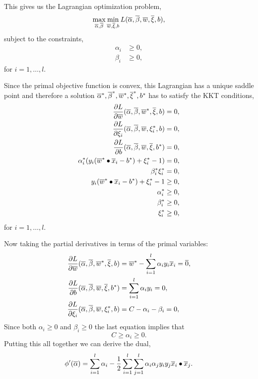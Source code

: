 \documentclass[a4paper,blends,pdf,colorBG,slideColor]{prosper}
\begin{document}
This gives us the Lagrangian optimization problem,
\begin{equation*}
\max_{\overline{\alpha},\overline{\beta}} \min_{\overline{w},\overline{\xi},b} L(\overline{\alpha},\overline{\beta},\overline{w},\overline{\xi},b),
\end{equation*}
subject to the constraints,
\begin{align*}
\alpha_i &\ge 0,\\
\beta_i &\ge 0,
\end{align*}
for $i = 1,\ldots,l.$

\es

Since the primal objective function is convex, this Lagrangian has a unique saddle point
and therefore
a solution $\overline{\alpha}^*, \overline{\beta}^*,\overline{w}^*,\overline{\xi}^*, b^*$ has to satisfy the KKT conditions,
\begin{align*}
\frac{\partial L}{\partial \overline{w}}(\overline{\alpha},\overline{\beta}, \overline{w}^*,\overline{\xi},b) &= 0,\\
\frac{\partial L}{\partial \xi_i}(\overline{\alpha},\overline{\beta},\overline{w},\xi^*_i,b) &= 0,\\
\frac{\partial L}{\partial b}(\overline{\alpha},\overline{\beta},\overline{w},\overline{\xi},b^*) &= 0,\\
\alpha^*_i (y_i(\overline{w}^*\bullet\overline{x}_i - b^*) + \xi^*_i -1)&= 0, \\
\beta^*_i\xi^*_i&= 0,\\
y_i(\overline{w}^*\bullet\overline{x}_i - b^*) + \xi^*_i -1&\ge 0, \\
\alpha^*_i &\ge 0,\\
\beta^*_i &\ge 0,\\
\xi^*_i &\ge 0,
\end{align*}
for $i = 1,\ldots,l$.
\es

\small
Now taking the partial derivatives in terms of the primal variables:
\begin{align*}
\frac{\partial L}{\partial \overline{w}}(\overline{\alpha},\overline{\beta}, \overline{w}^*,\overline{\xi},b) &=
	\overline{w}^* - \sum_{i=1}^l \alpha_i y_i  \overline{x}_i = \overline{0},\\
\frac{\partial L}{\partial b}(\overline{\alpha},\overline{\beta},\overline{w},\overline{\xi},b^*) &=\sum_{i=1}^l \alpha_i y_i = 0,\\
\frac{\partial L}{\partial \xi_i}(\overline{\alpha},\overline{\beta},\overline{w},\xi^*_i,b) &= C - \alpha_i - \beta_i= 0,
\end{align*}
Since both $\alpha_i \ge 0$ and $\beta_i \ge 0$ the last equation implies that
\begin{equation*}
C \ge \alpha_i \ge 0.
\end{equation*}
Putting this all together we can derive the dual,
\begin{equation*}
\phi'(\overline{\alpha}) = 
  \sum_{i=1}^l \alpha_i - 
  \frac{1}{2}\sum_{i=1}^l \sum_{j=1}^l \alpha_i \alpha_j y_i y_j \overline{x}_i \bullet \overline{x}_j.
\end{equation*}
\es
\end{document}
